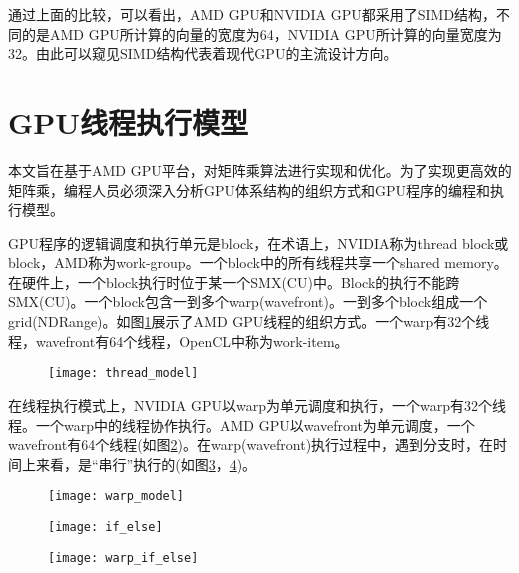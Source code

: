 通过上面的比较，可以看出，AMD GPU和NVIDIA GPU都采用了SIMD结构，不同的是AMD GPU所计算的向量的宽度为64，NVIDIA GPU所计算的向量宽度为32。由此可以窥见SIMD结构代表着现代GPU的主流设计方向。




\section{GPU线程执行模型}
本文旨在基于AMD GPU平台，对矩阵乘算法进行实现和优化。为了实现更高效的矩阵乘，编程人员必须深入分析GPU体系结构的组织方式和GPU程序的编程和执行模型。

GPU程序的逻辑调度和执行单元是block，在术语上，NVIDIA称为thread block或block，AMD称为work-group。一个block中的所有线程共享一个shared memory。在硬件上，一个block执行时位于某一个SMX(CU)中。Block的执行不能跨SMX(CU)。一个block包含一到多个warp(wavefront)。一到多个block组成一个grid(NDRange)。如图\ref{fig:thread_model}展示了AMD GPU线程的组织方式。一个warp有32个线程，wavefront有64个线程，OpenCL中称为work-item。

\begin{figure}[htbp]
	\centering
	\texttt{[image: thread\_model]}
	\label{fig:thread_model}
\end{figure}

在线程执行模式上，NVIDIA GPU以warp为单元调度和执行，一个warp有32个线程。一个warp中的线程协作执行。AMD GPU以wavefront为单元调度，一个wavefront有64个线程(如图\ref{fig:warp_model})。在warp(wavefront)执行过程中，遇到分支时，在时间上来看，是“串行”执行的(如图\ref{fig:if_else}，\ref{fig:warp_if_else})。

\begin{figure}[htbp]
	\centering
	\texttt{[image: warp\_model]}
	\label{fig:warp_model}
\end{figure}


\begin{figure}[htbp]
	\centering
	\texttt{[image: if\_else]}
	\label{fig:if_else}
\end{figure}

\begin{figure}[htbp]
	\centering
	\texttt{[image: warp\_if\_else]}
	\label{fig:warp_if_else}
\end{figure}

